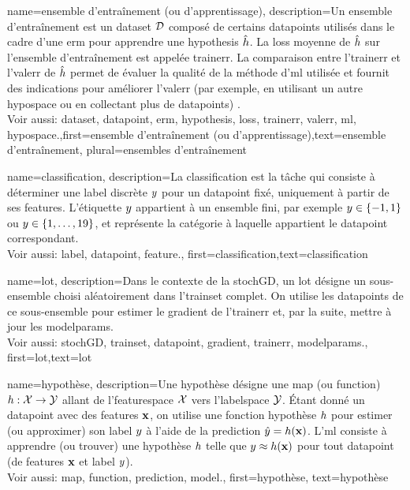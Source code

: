 {name={ensemble d'entraînement (ou d'apprentissage)},
	description={Un ensemble d'entraînement est un \gls{dataset} $\mathcal{D}$ composé de certains \glspl{datapoint} utilisés dans le cadre d'une \gls{erm} 
		pour apprendre une \gls{hypothesis} $\hat{h}$. La \gls{loss} moyenne de $\hat{h}$ sur 
		l'ensemble d'entraînement est appelée \gls{trainerr}. La comparaison entre l'\gls{trainerr} et l'\gls{valerr} de $\hat{h}$ permet de évaluer la qualité de la méthode d'\gls{ml} utilisée et fournit des indications 
		pour améliorer l'\gls{valerr} (par exemple, en utilisant un autre \gls{hypospace} ou en collectant plus de \glspl{datapoint}) \cite[Sec. 6.6]{MLBasics}.
		\\
		Voir aussi: \gls{dataset}, \gls{datapoint}, \gls{erm}, \gls{hypothesis}, \gls{loss}, \gls{trainerr}, \gls{valerr}, \gls{ml}, \gls{hypospace}.},first={ensemble d'entraînement (ou d'apprentissage)},text={ensemble d'entraînement}, plural={ensembles d'entraînement}  
}

{name={classification},
	description={La classification est la tâche qui consiste à déterminer une \gls{label} discrète $y$ pour un \gls{datapoint} fixé, uniquement à partir de ses \glspl{feature}. L'étiquette $y$ appartient à un ensemble fini, par exemple $y \in \{-1,1\}$ ou $y \in \{1,\ldots,19\}$, et représente la catégorie à laquelle appartient le \gls{datapoint} correspondant.
		\\ 
		Voir aussi: \gls{label}, \gls{datapoint}, \gls{feature}.},
	first={classification},text={classification} 
}

{
	name={lot},
	description={Dans le contexte de la \gls{stochGD}, un lot désigne un sous-ensemble choisi aléatoirement dans l’\gls{trainset} complet. On utilise les \glspl{datapoint} de ce sous-ensemble pour estimer le \gls{gradient} de l’\gls{trainerr} et, par la suite, mettre à jour les \glspl{modelparam}.
		\\
		Voir aussi: \gls{stochGD}, \gls{trainset}, \gls{datapoint}, \gls{gradient}, \gls{trainerr}, \glspl{modelparam}.}, 
	first={lot},text={lot}  
}

{name={hypothèse},
	description={Une hypothèse désigne une \gls{map} (ou \gls{function}) $h: \mathcal{X} \rightarrow \mathcal{Y}$ allant de l'\gls{featurespace} $\mathcal{X}$ vers l'\gls{labelspace} $\mathcal{Y}$. 
		Étant donné un \gls{datapoint} avec des \glspl{feature} ${\bf x}$, on utilise une fonction hypothèse $h$
		pour estimer (ou approximer) son \gls{label} $y$ à l’aide de la \gls{prediction}  
		$\hat{y} = h({\bf x})$. L’\gls{ml} consiste à apprendre (ou trouver) une 
		hypothèse $h$ telle que $y \approx h({\bf x})$ 
		pour tout \gls{datapoint} (de \glspl{feature} ${\bf x}$ et \gls{label} $y$).
		\\ 
		Voir aussi: \gls{map}, \gls{function}, \gls{prediction}, \gls{model}.},
	first={hypothèse}, text={hypothèse}
}

